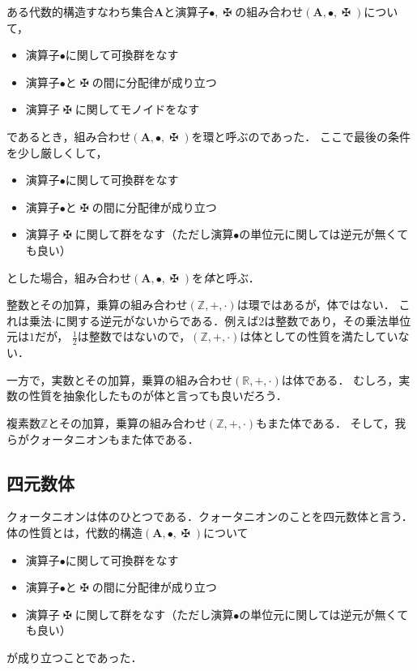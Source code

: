 \documentclass{jsbook}
\newcommand{\keyword}[1]{\emph{#1}}
\newcommand{\bg}[1]{\mathbf{#1}}
\newcommand{\opmaltese}{\mathop{\maltese}}
\begin{document}
ある代数的構造すなわち集合$\bg{A}$と演算子$\bullet,\opmaltese$の組み合わせ$(\bg{A},\bullet,\opmaltese)$について，
\begin{itemize}
\item 演算子$\bullet$に関して可換群をなす
\item 演算子$\bullet$と$\opmaltese$の間に分配律が成り立つ
\item 演算子$\opmaltese$に関してモノイドをなす
\end{itemize}
であるとき，組み合わせ$(\bg{A},\bullet,\opmaltese)$を環と呼ぶのであった．
ここで最後の条件を少し厳しくして，
\begin{itemize}
\item 演算子$\bullet$に関して可換群をなす
\item 演算子$\bullet$と$\opmaltese$の間に分配律が成り立つ
\item 演算子$\opmaltese$に関して群をなす（ただし演算$\bullet$の単位元に関しては逆元が無くても良い）
\end{itemize}
とした場合，組み合わせ$(\bg{A},\bullet,\opmaltese)$を\keyword{体}と呼ぶ．

整数とその加算，乗算の組み合わせ$(\mathbb{Z},+,\cdot)$は環ではあるが，体ではない．
これは乗法$\cdot$に関する逆元がないからである．例えば$2$は整数であり，その乗法単位元は$1$だが，
$\frac{1}{2}$は整数ではないので，$(\mathbb{Z},+,\cdot)$は体としての性質を満たしていない．

一方で，実数とその加算，乗算の組み合わせ$(\mathbb{R},+,\cdot)$は体である．
むしろ，実数の性質を抽象化したものが体と言っても良いだろう．

複素数$\mathbb Z$とその加算，乗算の組み合わせ$(\mathbb{Z},+,\cdot)$もまた体である．
そして，我らがクォータニオンもまた体である．

\subsection{四元数体}

クォータニオンは体のひとつである．クォータニオンのことを四元数体と言う．
体の性質とは，代数的構造$(\bg{A},\bullet,\opmaltese)$について
\begin{itemize}
\item 演算子$\bullet$に関して可換群をなす
\item 演算子$\bullet$と$\opmaltese$の間に分配律が成り立つ
\item 演算子$\opmaltese$に関して群をなす（ただし演算$\bullet$の単位元に関しては逆元が無くても良い）
\end{itemize}
が成り立つことであった．
\end{document}
